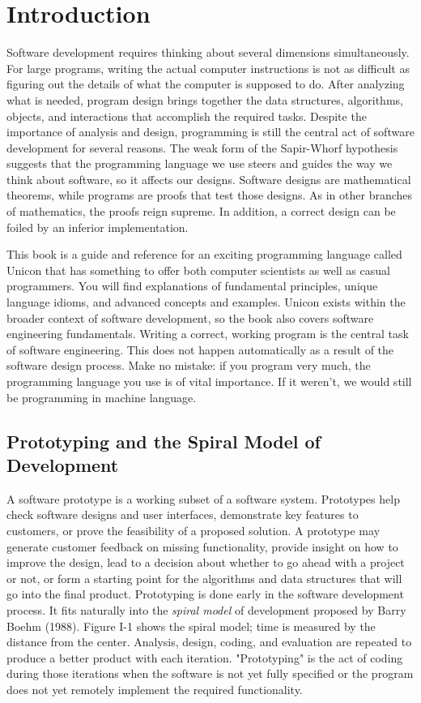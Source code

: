 \chapter*{Introduction}

Software development requires thinking about several
dimensions simultaneously. For large programs, writing the actual
computer instructions is not as difficult as figuring out the
details of what the computer is supposed to do. After analyzing what is
needed, program design brings together the data structures, algorithms,
objects, and interactions that accomplish the required tasks. Despite
the importance of analysis and design, programming is still the central
act of software development for several reasons. The weak form of the
Sapir-Whorf hypothesis suggests that the programming
language we use steers and guides the way we think about software, so
it affects our designs. Software designs are mathematical theorems,
while programs are proofs that test those designs. As in other
branches of mathematics, the proofs reign supreme. In addition, a
correct design can be foiled by an inferior implementation.

This book is a guide and reference for an exciting
programming language called Unicon that has something to offer both
computer scientists as well as casual programmers. You
will find explanations of fundamental principles, unique language
idioms, and advanced concepts and examples. Unicon exists within the
broader context of software development, so the book also covers
software engineering fundamentals. Writing a correct, working
program is the central task of software engineering. This does not
happen automatically as a result of the software design process. Make
no mistake: if you program very much, the programming language you use
is of vital importance. If it weren't, we would still
be programming in machine language.

\section*{Prototyping and the Spiral Model of Development}

A software prototype is a working subset of a software
system. Prototypes help check software designs and user
interfaces, demonstrate key features to customers, or prove the
feasibility of a proposed solution. A prototype may generate
customer feedback on missing functionality, provide insight on how to
improve the design, lead to a decision about whether to go ahead with a
project or not, or form a starting point for the algorithms and data
structures that will go into the final product. Prototyping is done
early in the software development process. It fits naturally into the
\textit{spiral model} of development proposed by
Barry Boehm (1988). Figure I-1 shows the spiral
model; time is measured by the distance from the center. Analysis,
design, coding, and evaluation are repeated to produce a better product
with each iteration. "Prototyping" is the
act of coding during those iterations when the software is not yet
fully specified or the program does not yet remotely implement the
required functionality.

